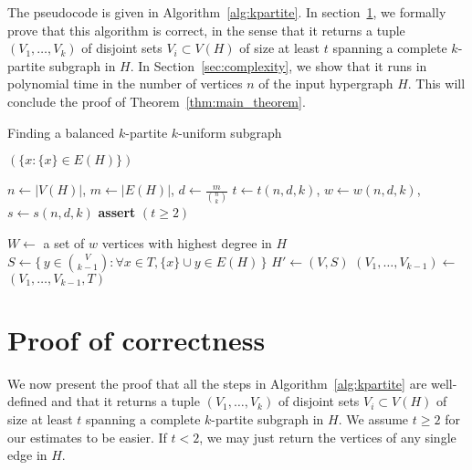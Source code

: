 The pseudocode is given in Algorithm~\ref{alg:kpartite}.
In section~\ref{sec:correctness}, we formally prove that this algorithm is correct,
in the sense that it returns a tuple $(V_1, \dots, V_k)$ of disjoint sets $V_i \subset V(H)$
of size at least $t$ spanning a complete $k$-partite subgraph in $H$.
In Section~\ref{sec:complexity}, we
show that it runs in polynomial time in the number of vertices $n$ of the input hypergraph $H$.
This will conclude the proof of Theorem~\ref{thm:main_theorem}.

\begin{algorithm}[H]
    \caption{Finding a balanced $k$-partite $k$-uniform subgraph}
    \label{alg:kpartite}
    \begin{algorithmic}[1]
                \State \Return $(\{x \colon \{x\} \in E(H)\})$
            \EndIf

            \State $n \gets |V(H)|$, $m \gets |E(H)|$, $d \gets \frac{m}{\binom{n}{k}}$
            \State $t \gets t(n, d, k)$, $w \gets w(n, d, k)$, $s \gets s(n, d, k)$
            \State \textbf{assert} $(t \ge 2)$

            \State $W \gets$ a set of $w$ vertices with highest degree in $H$
                \State $S \gets \{\,y \in \binom{V}{k-1} \colon \forall x \in T, \{x\} \cup y \in E(H)\,\}$
                    \State $H' \gets (V, S)$  
                    \State $(V_1, \dots, V_{k-1}) \gets$  \label{recurse}
                    \State \Return $(V_1, \dots, V_{k-1}, T)$
                \EndIf
            \EndFor
        \EndFunction
    \end{algorithmic}
\end{algorithm}

\section{Proof of correctness}\label{sec:correctness}

We now present the proof that
all the steps in Algorithm~\ref{alg:kpartite} are well-defined and that
it returns a tuple $(V_1, \dots, V_k)$ of disjoint sets $V_i \subset V(H)$
of size at least $t$ spanning a complete $k$-partite subgraph in $H$.
We assume $t \ge 2$ for our estimates to be easier.
If $t < 2$, we may just return the vertices of any single edge in $H$.


